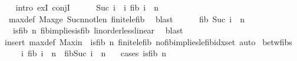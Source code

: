 \begin{isabellebody}
\ \ \isamarkupfalse%
{\isacharparenleft}{\kern0pt}intro\ exI\ conjI{\isacharparenright}{\kern0pt}\isanewline
\ \ \ \ \isamarkupfalse%
\ {\isachardoublequoteopen}{\isacharparenleft}{\kern0pt}Suc\ i{\isacharparenright}{\kern0pt}\ {\isasymnotin}\ {\isacharbraceleft}{\kern0pt}i{\isachardot}{\kern0pt}\ fib\ i\ {\isacharless}{\kern0pt}\ n{\isacharbraceright}{\kern0pt}{\isachardoublequoteclose}\ \isamarkupfalse%
\ max{\isacharunderscore}{\kern0pt}def\ Max{\isacharunderscore}{\kern0pt}ge\ Suc{\isacharunderscore}{\kern0pt}n{\isacharunderscore}{\kern0pt}not{\isacharunderscore}{\kern0pt}le{\isacharunderscore}{\kern0pt}n\ finite{\isacharunderscore}{\kern0pt}le{\isacharunderscore}{\kern0pt}fib\ \isamarkupfalse%
\ blast\isanewline
\ \ \ \ \isamarkupfalse%
\ {\isachardoublequoteopen}fib\ {\isacharparenleft}{\kern0pt}Suc\ i{\isacharparenright}{\kern0pt}\ {\isachargreater}{\kern0pt}\ n{\isachardoublequoteclose}\ \isanewline
\ \ \ \ \ \ \isamarkupfalse%
\ {\isacartoucheopen}{\isasymnot}\ is{\isacharunderscore}{\kern0pt}fib\ n{\isacartoucheclose}\ fib{\isacharunderscore}{\kern0pt}implies{\isacharunderscore}{\kern0pt}is{\isacharunderscore}{\kern0pt}fib\ linorder{\isacharunderscore}{\kern0pt}less{\isacharunderscore}{\kern0pt}linear\ \isamarkupfalse%
\ blast\isanewline
\ \ \isamarkupfalse%
{\isacharparenleft}{\kern0pt}insert\ max{\isacharunderscore}{\kern0pt}def\ Max{\isacharunderscore}{\kern0pt}in\ {\isacartoucheopen}{\isasymnot}\ is{\isacharunderscore}{\kern0pt}fib\ n{\isacartoucheclose}\ finite{\isacharunderscore}{\kern0pt}le{\isacharunderscore}{\kern0pt}fib\ no{\isacharunderscore}{\kern0pt}fib{\isacharunderscore}{\kern0pt}implies{\isacharunderscore}{\kern0pt}le{\isacharunderscore}{\kern0pt}fib{\isacharunderscore}{\kern0pt}idx{\isacharunderscore}{\kern0pt}set{\isacharcomma}{\kern0pt}\ auto{\isacharparenright}{\kern0pt}\isanewline
{}\isamarkupfalse%
%
\endisatagproof
{\isafoldproof}%
%
\isadelimproof
\isanewline
%
\endisadelimproof
\isanewline
{}\isamarkupfalse%
\ betw{\isacharunderscore}{\kern0pt}fibs{\isacharcolon}{\kern0pt}\ \isanewline
\ \ \ {\isachardoublequoteopen}{\isasymexists}\ i{\isachardot}{\kern0pt}\ fib\ i\ {\isasymle}\ n\ {\isasymand}\ fib{\isacharparenleft}{\kern0pt}Suc\ i{\isacharparenright}{\kern0pt}\ {\isachargreater}{\kern0pt}\ n{\isachardoublequoteclose}\ \ \ \isanewline
%
\isadelimproof
%
\endisadelimproof
%
\isatagproof
{}\isamarkupfalse%
{\isacharparenleft}{\kern0pt}cases\ {\isachardoublequoteopen}is{\isacharunderscore}{\kern0pt}fib\ n{\isachardoublequoteclose}{\isacharparenright}{\kern0pt}\isanewline

\end{isabellebody}
